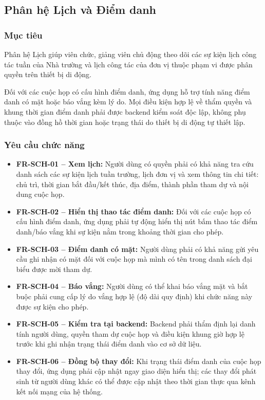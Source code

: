 \subsection{Phân hệ Lịch và Điểm danh}
\label{subsec:req_schedule}

\subsubsection{Mục tiêu}
Phân hệ Lịch giúp viên chức, giảng viên chủ động theo dõi các sự kiện lịch công tác tuần của Nhà trường và lịch công tác của đơn vị thuộc phạm vi được phân quyền trên thiết bị di động.

Đối với các cuộc họp có cấu hình điểm danh, ứng dụng hỗ trợ tính năng điểm danh có mặt hoặc báo vắng kèm lý do. Mọi điều kiện hợp lệ về thẩm quyền và khung thời gian điểm danh phải được backend kiểm soát độc lập, không phụ thuộc vào đồng hồ thời gian hoặc trạng thái do thiết bị di động tự thiết lập.

\subsubsection{Yêu cầu chức năng}

\begin{itemize}[leftmargin=1.5cm]
    \item \textbf{FR-SCH-01 -- Xem lịch:} Người dùng có quyền phải có khả năng tra cứu danh sách các sự kiện lịch tuần trường, lịch đơn vị và xem thông tin chi tiết: chủ trì, thời gian bắt đầu/kết thúc, địa điểm, thành phần tham dự và nội dung cuộc họp.
    
    \item \textbf{FR-SCH-02 -- Hiển thị thao tác điểm danh:} Đối với các cuộc họp có cấu hình điểm danh, ứng dụng phải tự động hiển thị nút bấm thao tác điểm danh/báo vắng khi sự kiện nằm trong khoảng thời gian cho phép.
    
    \item \textbf{FR-SCH-03 -- Điểm danh có mặt:} Người dùng phải có khả năng gửi yêu cầu ghi nhận có mặt đối với cuộc họp mà mình có tên trong danh sách đại biểu được mời tham dự.
    
    \item \textbf{FR-SCH-04 -- Báo vắng:} Người dùng có thể khai báo vắng mặt và bắt buộc phải cung cấp lý do vắng hợp lệ (độ dài quy định) khi chức năng này được sự kiện cho phép.
    
    \item \textbf{FR-SCH-05 -- Kiểm tra tại backend:} Backend phải thẩm định lại danh tính người dùng, quyền tham dự cuộc họp và điều kiện khung giờ hợp lệ trước khi ghi nhận trạng thái điểm danh vào cơ sở dữ liệu.
    
    \item \textbf{FR-SCH-06 -- Đồng bộ thay đổi:} Khi trạng thái điểm danh của cuộc họp thay đổi, ứng dụng phải cập nhật ngay giao diện hiển thị; các thay đổi phát sinh từ người dùng khác có thể được cập nhật theo thời gian thực qua kênh kết nối mạng của hệ thống.
\end{itemize}

